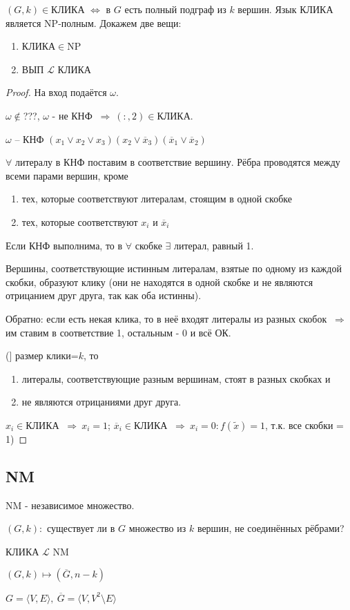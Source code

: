 \documentclass[draft]{report}
\newcommand{\w}{\omega}
\newcommand{\then}{\ensuremath{\ \Rightarrow\ }}
\newcommand{\nx}{\overline{x}}
\newcommand{\F}{\ensuremath{\forall}}
\newcommand{\E}{\ensuremath{\exists}}
\theoremstyle {remark}
\theoremstyle {remark}
\renewcommand{\ss}[1]
{
\phantomsection
\subsection*{#1}
\addcontentsline{toc}{subsection}{#1}
}
\begin{document}
$(G,k)\in$КЛИКА $\Leftrightarrow$ в $G$ есть полный подграф из $k$ вершин.
{\theor Язык КЛИКА является NP-полным.}
Докажем две вещи:
\begin{enumerate}
	\item КЛИКА$\in$NP
	\item ВЫП $\mathcal{L}$ КЛИКА
\end{enumerate}
\begin{proof}
На вход подаётся $\w$.

$\w\notin$???, $\w$ - не КНФ \then $(:,2)\in$КЛИКА.

$\w$ -- КНФ $(x_1\lor x_2\lor x_3)(x_2\lor\nx_3)(\nx_1\lor\nx_2)$

$\forall$ литералу в КНФ поставим в соответствие вершину. Рёбра проводятся между всеми парами вершин, кроме
\begin{enumerate}
\item тех, которые соответствуют литералам, стоящим в одной скобке
\item тех, которые соответствуют $x_i$ и $\nx_i$
\end{enumerate}
Если КНФ выполнима, то в $\F$ скобке $\E$ литерал, равный 1.

Вершины, соответствующие истинным литералам, взятые по одному из каждой скобки, образуют клику (они не находятся в одной скобке и не являются отрицанием друг друга, так как оба истинны).

Обратно: если есть некая клика, то в неё входят литералы из разных скобок \then им ставим в соответствие 1, остальным - 0 и всё ОК.

(] размер клики=$k$, то \begin{enumerate}
\item литералы, соответствующие разным вершинам, стоят в разных скобках и
\item не являются отрицаниями друг друга.
\end{enumerate}
$x_i\in$КЛИКА \then $x_i=1$; $\nx_i\in$КЛИКА \then $x_i=0\colon f(\tilde{x})=1$, т.к. все скобки = 1)
\end{proof}


\ss {NM}

NM - независимое множество.

$(G,k):$ существует ли в $G$ множество из $k$ вершин, не соединённых рёбрами?

КЛИКА $\mathcal{L}$ NM

$(G,k)\mapsto(\overline{G},n-k)$

$G=\langle V,E\rangle,\ \overline{G}=\langle V,V^2\setminus E\rangle$
\end{document}
